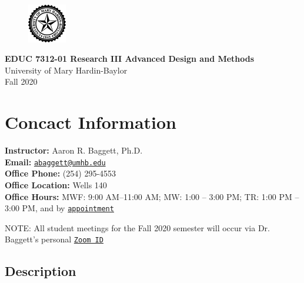 \documentclass[
]{article}
\author{}
\date{\vspace{-2.5em}}
\begin{document}
\makeatletter
\setlength{\@fptop}{0pt}
\makeatother

\begin{figure}[t!]
  \centering
  \includegraphics[keepaspectratio, width=0.15\textwidth]{./Figs/Seal-Black}
\end{figure}


\begin{center}
{\LARGE{\bf{EDUC 7312-01 Research III Advanced Design and Methods}}}\\
{\small{University of Mary Hardin-Baylor}}\\
\vspace{.15in}
{\large{Fall 2020}}
\end{center}

\thispagestyle{empty}

\vspace{3mm}

\vspace{.25in}

\section{Concact Information}

\textbf{Instructor:} Aaron R. Baggett, Ph.D.\\
\textbf{Email:}
\texttt{\href{mailto:abaggett@umhb.edu}{abaggett@umhb.edu}}\\
\textbf{Office Phone:} (254) 295-4553\\
\textbf{Office Location:} Wells 140\\
\textbf{Office Hours:} MWF: 9:00 AM--11:00 AM; MW: 1:00 -- 3:00 PM; TR:
1:00 PM -- 3:00 PM, and by
\texttt{\href{mailto:abaggett@umhb.edu}{appointment}}

\begin{tcolorbox}
[width=\linewidth, sharp corners=all, colback=white!95!red]
NOTE: All student meetings for the Fall 2020 semester will occur via Dr. Baggett's personal \texttt{\href{https://umhb.zoom.us/j/5393191651}{Zoom ID}}
\end{tcolorbox}

\subsection{Description}
\end{document}
